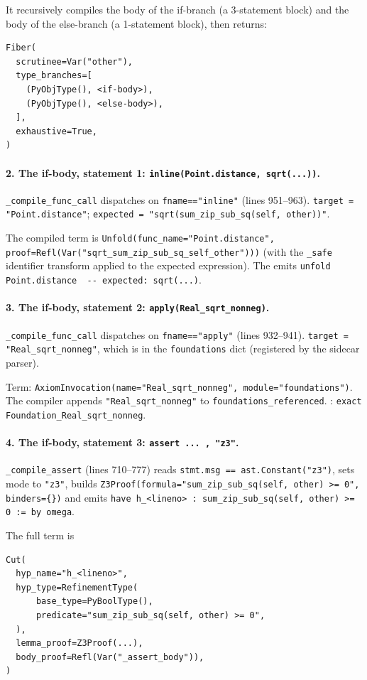 It recursively compiles the body of the if-branch (a 3-statement
block) and the body of the else-branch (a 1-statement block), then
returns:

\begin{verbatim}
Fiber(
  scrutinee=Var("other"),
  type_branches=[
    (PyObjType(), <if-body>),
    (PyObjType(), <else-body>),
  ],
  exhaustive=True,
)
\end{verbatim}

\paragraph{2. The if-body, statement 1: \texttt{inline(Point.distance, sqrt(...))}.}
\texttt{\_compile\_func\_call} dispatches on \texttt{fname=="inline"}
(lines 951--963).  \texttt{target = "Point.distance"};
\texttt{expected = "sqrt(sum\_zip\_sub\_sq(self, other))"}.

The compiled term is
\texttt{Unfold(func\_name="Point.distance",
proof=Refl(Var("sqrt\_sum\_zip\_sub\_sq\_self\_other")))} (with the
\texttt{\_safe} identifier transform applied to the expected
expression).  The \Lean{} emits
\verb|unfold Point.distance  -- expected: sqrt(...)|.

\paragraph{3. The if-body, statement 2: \texttt{apply(Real\_sqrt\_nonneg)}.}
\texttt{\_compile\_func\_call} dispatches on \texttt{fname=="apply"}
(lines 932--941).  \texttt{target = "Real\_sqrt\_nonneg"}, which is
in the \texttt{foundations} dict (registered by the sidecar parser).

Term: \texttt{AxiomInvocation(name="Real\_sqrt\_nonneg",
module="foundations")}.  The compiler appends
\texttt{"Real\_sqrt\_nonneg"} to \texttt{foundations\_referenced}.
\Lean{}: \verb|exact Foundation_Real_sqrt_nonneg|.

\paragraph{4. The if-body, statement 3: \texttt{assert ... , "z3"}.}
\texttt{\_compile\_assert} (lines 710--777) reads \texttt{stmt.msg ==
ast.Constant("z3")}, sets mode to \texttt{"z3"}, builds
\texttt{Z3Proof(formula="sum\_zip\_sub\_sq(self, other) >= 0",
binders=\{\})} and emits
\verb|have h_<lineno> : sum_zip_sub_sq(self, other) >= 0 := by omega|.

The full term is
\begin{verbatim}
Cut(
  hyp_name="h_<lineno>",
  hyp_type=RefinementType(
      base_type=PyBoolType(),
      predicate="sum_zip_sub_sq(self, other) >= 0",
  ),
  lemma_proof=Z3Proof(...),
  body_proof=Refl(Var("_assert_body")),
)
\end{verbatim}

